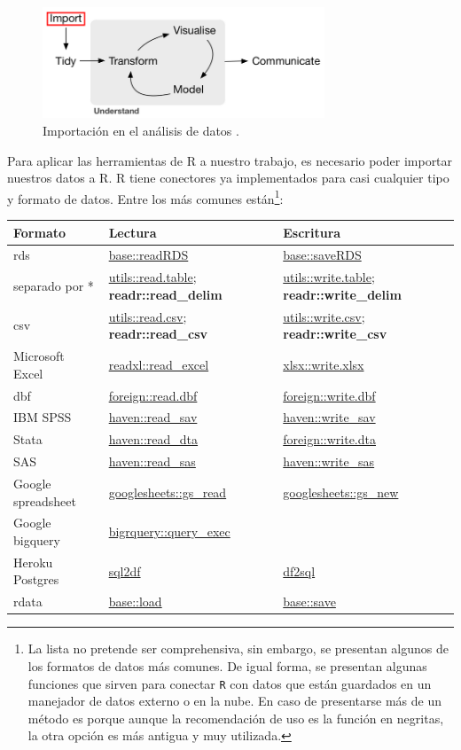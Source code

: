 \documentclass[]{article}
\let\rmarkdownfootnote\footnote%
\def\footnote{\protect\rmarkdownfootnote}
\begin{document}
\begin{figure}[h]
    \centering
    \includegraphics[width=0.75\textwidth]{../img/02_ciclo_1.png}
    \caption{Importación en el análisis de datos \textcite[Introducción]{grolemund2016r}.}
    \label{fig:ciclo1}
\end{figure}

Para aplicar las herramientas de R a nuestro trabajo, es necesario poder
importar nuestros datos a R. R tiene conectores ya implementados para
casi cualquier tipo y formato de datos. Entre los más comunes
están\footnote{La lista no pretende ser comprehensiva, sin embargo, se presentan algunos de los formatos de datos más comunes. De igual forma, se presentan algunas funciones que sirven para conectar \texttt{R} con datos que están guardados en un manejador de datos externo o en la nube. En caso de presentarse más de un método es porque aunque la recomendación de uso es la función en negritas, la otra opción es más antigua y muy utilizada.}:

\begin{longtable}[]{@{}lll@{}}
\toprule
Formato & Lectura & Escritura\tabularnewline
\midrule
\endhead
rds & \hyperref[rds]{base::readRDS} &
\hyperref[rds]{base::saveRDS}\tabularnewline
separado por * & \hyperref[separado-por]{utils::read.table};
\textbf{readr::read\_delim} &
\hyperref[separado-por]{utils::write.table};
\textbf{readr::write\_delim}\tabularnewline
csv & \hyperref[csv]{utils::read.csv}; \textbf{readr::read\_csv} &
\hyperref[csv]{utils::write.csv};
\textbf{readr::write\_csv}\tabularnewline
Microsoft Excel & \hyperref[microsoft-excel]{readxl::read\_excel} &
\hyperref[microsoft-excel]{xlsx::write.xlsx}\tabularnewline
dbf & \hyperref[dbf]{foreign::read.dbf} &
\hyperref[dbf]{foreign::write.dbf}\tabularnewline
IBM SPSS & \hyperref[ibm-spss]{haven::read\_sav} &
\hyperref[ibm-spss]{haven::write\_sav}\tabularnewline
Stata & \hyperref[stata]{haven::read\_dta} &
\hyperref[stata]{foreign::write.dta}\tabularnewline
SAS & \hyperref[sas]{haven::read\_sas} &
\hyperref[sas]{haven::write\_sas}\tabularnewline
Google spreadsheet &
\hyperref[google-spreadsheet]{googlesheets::gs\_read} &
\hyperref[google-spreadsheet]{googlesheets::gs\_new}\tabularnewline
Google bigquery & \hyperref[google-bigquery]{bigrquery::query\_exec}
&\tabularnewline
Heroku Postgres & \hyperref[heroku-postgres]{sql2df} &
\hyperref[heroku-postgres]{df2sql}\tabularnewline
rdata & \hyperref[rdata]{base::load} &
\hyperref[rdata]{base::save}\tabularnewline
\bottomrule
\end{longtable}
\end{document}

